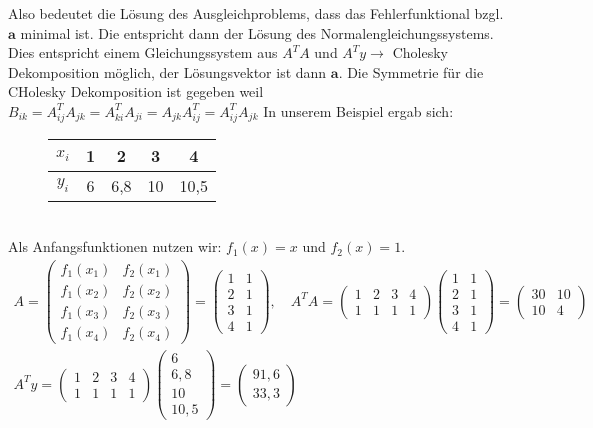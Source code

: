 \documentclass{scrartcl}
\begin{document}
Also bedeutet die Lösung des Ausgleichproblems, dass das Fehlerfunktional bzgl. $\boldsymbol{a}$ minimal ist.
Die entspricht dann der Lösung des Normalengleichungssystems.
Dies entspricht einem Gleichungssystem aus $A^T A$ und $A^T y \rightarrow$ Cholesky Dekomposition möglich, der Lösungsvektor ist dann $\boldsymbol{a}$. 
Die Symmetrie für die CHolesky Dekomposition ist gegeben weil $B_{ik}=A_{ij}^TA_{jk}=A_{ki}^T A_{ji}=A_{jk}A_{ij}^T=A_{ij}^T A_{jk}$
In unserem Beispiel ergab sich: \begin{figure}[h]
\center

\begin{tabular}{|c||c|c|c|c|}

$x_i$ & 1 & 2 & 3 & 4 \\ 
\hline 
$y_i$ & 6 & 6,8 & 10 & 10,5 \\ 

\end{tabular}
\end{figure}\\
Als Anfangsfunktionen nutzen wir: $f_1(x)=x$ und $f_2(x)=1$.
\begin{align*}
A=\begin{pmatrix}
f_1(x_1) & f_2(x_1) \\
f_1(x_2) & f_2(x_2) \\
f_1(x_3) & f_2(x_3) \\
f_1(x_4) & f_2(x_4) 
\end{pmatrix}= \begin{pmatrix}
1 & 1\\
2 & 1\\
3 & 1\\
4 & 1
\end{pmatrix}, \quad A^T A = \begin{pmatrix}
1 & 2 & 3 & 4\\
1 & 1 & 1 & 1
\end{pmatrix} \begin{pmatrix}
1 & 1\\
2 & 1\\
3 & 1\\
4 & 1
\end{pmatrix}
=\begin{pmatrix}
30 & 10 \\
10 & 4
\end{pmatrix} \\
A^T y = \begin{pmatrix}
1 & 2 & 3 & 4\\
1 & 1 & 1 & 1
\end{pmatrix} \begin{pmatrix}
6 \\
6,8 \\
10\\
10,5
\end{pmatrix}= \begin{pmatrix}
91,6 \\
33,3
\end{pmatrix}
\end{align*}  
\end{document}
